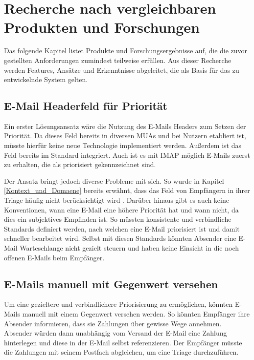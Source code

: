 
\chapter{Recherche nach vergleichbaren Produkten und Forschungen}
\label{Recherche_nach_vergleichbaren_Produkten_und_Forschungen}

Das folgende Kapitel listet Produkte und Forschungsergebnisse auf, die die zuvor gestellten Anforderungen zumindest teilweise erfüllen. Aus dieser Recherche werden Features, Ansätze und Erkenntnisse abgeleitet, die als Basis für das zu entwickelnde System gelten.

\section{E-Mail Headerfeld für Priorität}
Ein erster Lösungsansatz wäre die Nutzung des E-Mails Headers zum Setzen der Priorität. Da dieses Feld bereits in diversen MUAs und bei Nutzern etabliert ist, müsste hierfür keine neue Technologie implementiert werden. Außerdem ist das Feld bereits im Standard integriert. Auch ist es mit IMAP möglich E-Mails zuerst zu erhalten, die als priorisiert gekennzeichnet sind.

Der Ansatz bringt jedoch diverse Probleme mit sich. So wurde in Kapitel \ref{Kontext_und_Domaene} bereits erwähnt, dass das Feld von Empfängern in ihrer Triage häufig nicht berücksichtigt wird \citep[S. 279 f.]{Whittaker1996}. Darüber hinaus gibt es auch keine Konventionen, wann eine E-Mail eine höhere Priorität hat und wann nicht, da dies ein subjektives Empfinden ist. So müssten konsistente und verbindliche Standards definiert werden, nach welchen eine E-Mail priorisiert ist und damit schneller bearbeitet wird. Selbst mit diesen Standards könnten Absender eine E-Mail Warteschlange nicht gezielt steuern und haben keine Einsicht in die noch offenen E-Mails beim Empfänger.

\section{E-Mails manuell mit Gegenwert versehen}
Um eine gezieltere und verbindlichere Priorisierung zu ermöglichen, könnten E-Mails manuell mit einem Gegenwert versehen werden. So könnten Empfänger ihre Absender informieren, dass sie Zahlungen über gewisse Wege annehmen. Absender würden dann unabhängig vom Versand der E-Mail eine Zahlung hinterlegen und diese in der E-Mail selbst referenzieren. Der Empfänger müsste die Zahlungen mit seinem Postfach abgleichen, um eine Triage durchzuführen.

